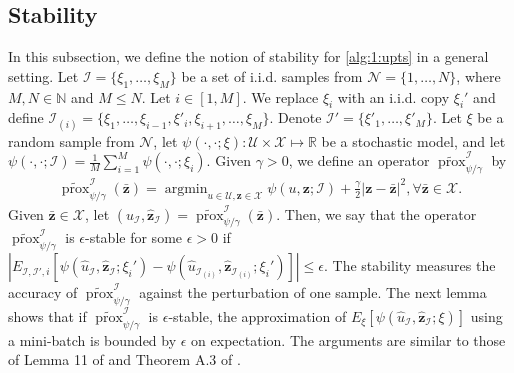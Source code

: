 \documentclass[10pt,reqno]{amsart}
\newcommand{\argmin}{\operatorname{argmin}}
\newcommand{\1}{{\chi}}
\def\leq{\leqslant}
\numberwithin{equation}{section}
\theoremstyle{thmlemcorr}
\numberwithin{theorem}{section}
\theoremstyle{thmlemcorr*}
\theoremstyle{defi}
\theoremstyle{remexample}
\theoremstyle{ass}
\begin{document}
\subsection{Stability}
\label{subsecStab}
In this subsection, we define the notion of stability for \eqref{alg:1:upts} in a general setting. Let ${\mathcal{I}} = \{\xi_1, \dots, \xi_{M}\}$ be a set of i.i.d. samples from ${\mathcal{N}}=\{1, \dots, N\}$, where $M, N \in \mathbb{N}$ and $M \leq N$. Let $i\in [1, M]$.  We replace $\xi_i$ with an i.i.d. copy $\xi_i'$ and define ${\mathcal{I}}_{(i)}=\{\xi_1, \dots, \xi_{i-1}, \xi'_{i}, \xi_{i+1}, \dots, \xi_M\}$. Denote ${\mathcal{I}}' = \{\xi'_1, \dots, \xi'_{M}\}$. Let $\xi$ be a random sample from $\mathcal{N}$, let $\psi(\cdot, \cdot; \xi):\mathcal{U}\times\mathcal{X}\mapsto\mathbb{R}$ be a stochastic model,  and let $\psi(\cdot, \cdot; {\mathcal{I}}) = \frac{1}{M}\sum_{i=1}^M\psi(\cdot, \cdot; \xi_i)$. Given $\gamma>0$, we define an operator $\widetilde{\operatorname{prox}}_{\psi/\gamma}^{\mathcal{I}}$ by
\begin{align}
	\label{defhprox}
	\widetilde{\operatorname{prox}}_{\psi/\gamma}^{\mathcal{I}} (\bar{\boldsymbol{z}})= \argmin_{u\in \mathcal{U}, \boldsymbol{z}\in \mathcal{X}}\psi(u, \boldsymbol{z}; {\mathcal{I}}) + \frac{\gamma}{2}|\boldsymbol{z}-\bar{\boldsymbol{z}}|^2, \forall \bar{\boldsymbol{z}}\in \mathcal{X}. 
\end{align}
Given $\bar{\boldsymbol{z}}\in \mathcal{X}$,  let $(\hat{u}_{\mathcal{I}}, \hat{\boldsymbol{z}}_{\mathcal{I}})=\widetilde{\operatorname{prox}}_{\psi/\gamma}^{\mathcal{I}}(\bar{\boldsymbol{z}})$. Then, we say that the operator $\widetilde{\operatorname{prox}}_{\psi/\gamma}^{\mathcal{I}}$ is $\epsilon$-stable for some $\epsilon>0$ if $|E_{{\mathcal{I}}, {\mathcal{I}}', i}[ \psi(\hat{u}_{{\mathcal{I}}}, \hat{\boldsymbol{z}}_{\mathcal{I}}; \xi_i') - \psi(\hat{u}_{{\mathcal{I}}_{(i)}}, \hat{\boldsymbol{z}}_{{\mathcal{I}}_{(i)}}; \xi_i') ]|\leq \epsilon$. The stability measures the accuracy of  $\widetilde{\operatorname{prox}}_{\psi/\gamma}^{\mathcal{I}}$ against the perturbation of one sample. 
The next lemma shows that if $\widetilde{\operatorname{prox}}_{\psi/\gamma}^{\mathcal{I}}$ is $\epsilon$-stable, the approximation of $E_{\xi}[\psi(\hat{u}_{\mathcal{I}}, \hat{\boldsymbol{z}}_{\mathcal{I}};\xi)]$ using a mini-batch is bounded by $\epsilon$ on expectation. The arguments are similar to those of Lemma 11 of \cite{bousquet2002stability} and Theorem A.3 of \cite{deng2021minibatch}. 
\end{document}
